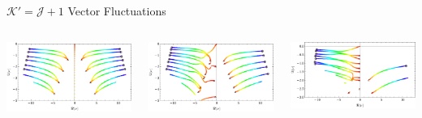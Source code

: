 \documentclass[xcolor=dvipsnames]{beamer}
\begin{document}
\begin{frame}{\(\mathcal K' = \mathcal J + 1\) Vector Fluctuations}
  \begin{columns}[T]
    \begin{column}{0.33\textwidth}
      \includegraphics[width=1.05\textwidth]{figs/Vector_rp_10_grid_45_a_0.pdf}
    \end{column}

    \begin{column}{0.33\textwidth}
      \includegraphics[width=1.05\textwidth]{figs/Vector_rp_10_grid_45_a_1_2.pdf}
    \end{column}

    \begin{column}{0.33\textwidth}
      \includegraphics[width=1.05\textwidth]{figs/Vector_rp_10_grid_45_a_9_10.pdf}
    \end{column}
  \end{columns}


\end{frame}
\end{document}
